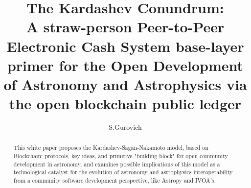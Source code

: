 \documentclass[final,5p,times,twocolumn,authoryear]{elsarticle}
\begin{document}
\begin{frontmatter}

\title{The Kardashev Conundrum:\\ A straw-person Peer-to-Peer Electronic Cash System base-layer primer for the Open Development of Astronomy and Astrophysics via the open blockchain public ledger}
 
    \author[iate,wsu]{S.Gurovich}
  
\address[iate]{
   Instituto De Astronom\'ia Te\'orica y Experimental -
   Observatorio Astron\'omico C\'ordoba (IATE--OAC--UNC--CONICET),
   Laprida 854, X5000BGR, C\'ordoba, Argentina}
\address[wsu]{
   Western Sydney University, Kingswood campus, NSW, Australia (visiting fellow 2019-2020)
}

\begin{abstract}
This white paper proposes the Kardashev-Sagan-Nakamoto model, based on Blockchain: protocols, key ideas, and primitive "building block" for open community development in astronomy, and examines possible implications of this model as a technological catalyst for the evolution of astronomy and astrophysics interoperability from a community software  development  perspective, like Astropy and IVOA's.  


\end{abstract}
\end{frontmatter}
\end{document}
